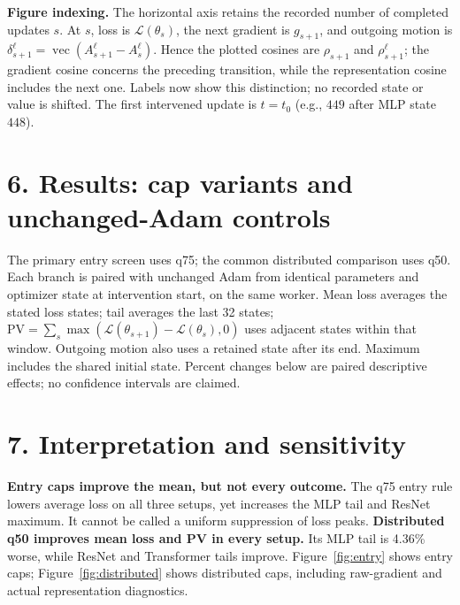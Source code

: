 \documentclass[11pt,a4paper]{article}
\newcommand{\vecop}{\operatorname{vec}}
\newcommand{\sect}[1]{\vspace{2pt}\section*{#1}\vspace{-4pt}}
\begin{document}
\textbf{Figure indexing.} The horizontal axis retains the recorded number of
completed updates $s$. At $s$, loss is $\mathcal L(\theta_s)$, the next gradient
is $g_{s+1}$, and outgoing motion is $\delta_{s+1}^\ell=\vecop(A_{s+1}^\ell-A_s^\ell)$.
Hence the plotted cosines are $\rho_{s+1}$ and $\rho_{s+1}^\ell$; the gradient
cosine concerns the preceding transition, while the representation cosine includes
the next one. Labels now show this distinction; no recorded state or value is shifted.
The first intervened update is $t=t_0$ (e.g., $449$ after MLP state $448$).
\sect{6. Results: cap variants and unchanged-Adam controls}
The primary entry screen uses q75; the common distributed comparison uses q50.
Each branch is paired with unchanged Adam from identical parameters and optimizer
state at intervention start, on the same worker. Mean loss averages the stated loss states; tail averages the last
32 states; $\mathrm{PV}=\sum_s\max(\mathcal L(\theta_{s+1})-\mathcal L(\theta_s),0)$ uses adjacent states within
that window. Outgoing motion also uses a retained state after its end.
Maximum includes the shared initial state. Percent changes below
are paired descriptive effects; no confidence intervals are claimed.

\begin{table}[H]
\centering\small\setlength{\tabcolsep}{4pt}

\caption{Percent changes relative to each branch's own unchanged Adam control.
Negative values mean smaller loss or positive variation. MLP distributed results
use the extended window; the entry screen stops at 800.}
\label{tab:main}
\end{table}

\newpage
\sect{7. Interpretation and sensitivity}


\textbf{Entry caps improve the mean, but not every outcome.} The q75 entry rule
lowers average loss on all three setups, yet increases the MLP tail and ResNet
maximum. It cannot be called a uniform suppression of loss peaks.
\textbf{Distributed q50 improves mean loss and PV in every setup.}
Its MLP tail is 4.36\% worse, while ResNet and Transformer tails improve.
Figure~\ref{fig:entry} shows entry caps; Figure~\ref{fig:distributed} shows
distributed caps, including raw-gradient and actual representation diagnostics.

\begin{table}[H]
\centering\small\setlength{\tabcolsep}{7pt}

\caption{Scope/quantile checks using the full respective windows (MLP 448--1152;
ResNet 264--576). MLP entry q50 and distributed q50 share a matched worker;
ResNet entry q75 and distributed q75 are also matched.}
\label{tab:sensitivity}
\end{table}
\end{document}
